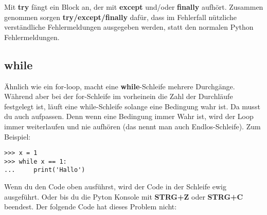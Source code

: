Mit \textbf{try} fängt ein Block an, der mit \textbf{except} und/oder \textbf{finally} aufhört. Zusammen genommen sorgen \textbf{try/except/finally} dafür, dass im Fehlerfall nützliche verständliche Fehlermeldungen ausgegeben werden, statt den normalen Python Fehlermeldungen.

\subsection*{while}

Ähnlich wie ein for-loop, macht eine \textbf{while}-Schleife mehrere Durchgänge. Während aber bei der for-Schleife im vorheinein die Zahl der Durchläufe festgelegt ist, läuft eine while-Schleife solange eine Bedingung wahr ist. Da musst du auch aufpassen. Denn wenn eine Bedingung immer Wahr ist, wird der Loop immer weiterlaufen und nie aufhören (das nennt man auch Endlos-Schleife). Zum Beispiel:

\begin{Verbatim}[frame=single]
>>> x = 1
>>> while x == 1:
...     print('Hallo')
\end{Verbatim}

Wenn du den Code oben ausführst, wird der Code in der Schleife ewig ausgeführt. Oder bis du die Pyton Konsole mit \textbf{STRG+Z} oder \textbf{STRG+C} beendest. Der folgende Code hat dieses Problem nicht:

